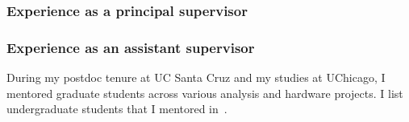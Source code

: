 \subsubsection{Experience as a principal supervisor \noneyet}\label{sssec:experience-as-a-principal-supervisor-noneyet}
\subsubsection{Experience as an assistant supervisor}\label{sssec:experience-as-an-assistant-supervisor}

During my postdoc tenure at UC Santa Cruz and my studies at UChicago, I mentored graduate students across various analysis and hardware projects. I list undergraduate students that I mentored in~.

